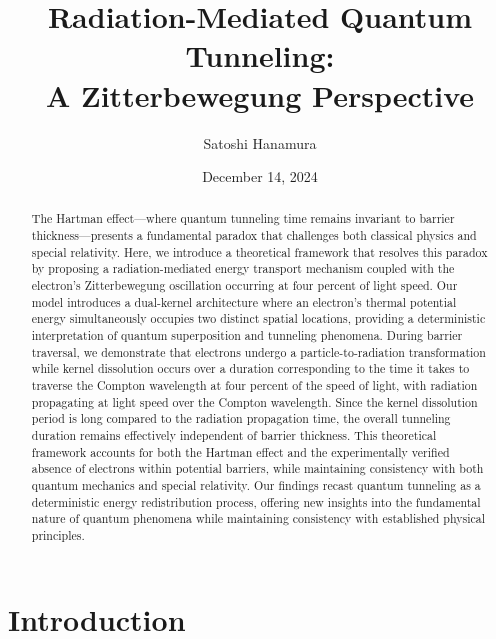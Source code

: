 \documentclass[%
 reprint,
 amsmath,amssymb,
 aps,
]{revtex4-1}
\numberwithin{equation}{section}%
\begin{document}

\title{Radiation-Mediated Quantum Tunneling:\\A Zitterbewegung Perspective}
\author{Satoshi Hanamura}
    \date{December 14, 2024}


\begin{abstract}
The Hartman effect—where quantum tunneling time remains invariant to barrier thickness—presents a fundamental paradox that challenges both classical physics and special relativity. Here, we introduce a theoretical framework that resolves this paradox by proposing a radiation-mediated energy transport mechanism coupled with the electron's Zitterbewegung oscillation occurring at four percent of light speed. Our model introduces a dual-kernel architecture where an electron's thermal potential energy simultaneously occupies two distinct spatial locations, providing a deterministic interpretation of quantum superposition and tunneling phenomena. During barrier traversal, we demonstrate that electrons undergo a particle-to-radiation transformation while kernel dissolution occurs over a duration corresponding to the time it takes to traverse the Compton wavelength at four percent of the speed of light, with radiation propagating at light speed over the Compton wavelength. Since the kernel dissolution period is long compared to the radiation propagation time, the overall tunneling duration remains effectively independent of barrier thickness. This theoretical framework accounts for both the Hartman effect and the experimentally verified absence of electrons within potential barriers, while maintaining consistency with both quantum mechanics and special relativity. Our findings recast quantum tunneling as a deterministic energy redistribution process, offering new insights into the fundamental nature of quantum phenomena while maintaining consistency with established physical principles.
\end{abstract}


\maketitle



\section{Introduction}
\label{sec:Introduction}
\end{document}
